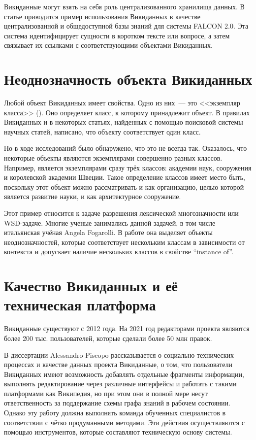 Викиданные могут взять на себя роль централизованного хранилища данных. В статье\autocite{Falcon_2.0} приводится пример использования Викиданных в качестве централизованной и общедоступной базы знаний для системы FALCON 2.0. Эта система идентифицирует сущности в коротком тексте или вопросе, а затем связывает их ссылками с соответствующими объектами Викиданных.

\section{Неоднозначность объекта Викиданных}

Любой объект Викиданных имеет свойства. Одно из них~--- это <<экземпляр класса>> (). Оно определяет класс, к которому принадлежит объект. В правилах Викиданных и в некоторых статьях\autocite{BabelNet}, найденных с помощью поисковой системы научных статей\footnotemark {}, написано, что объекту соответствует один класс.

Но в ходе исследований было обнаружено, что это не всегда так. Оказалось, что некоторые объекты являются экземплярами совершенно разных классов. Например,  является экземплярами сразу трёх классов: академии наук, сооружения и королевской академии Швеции. Такое определение классов имеет место быть, поскольку этот объект можно рассматривать и как организацию, целью которой является развитие науки, и как архитектурное сооружение. 

Этот пример относится к задаче разрешения лексической многозначности или WSD-задаче. Многие ученые занимались данной задачей, в том числе итальянская учёная Angela Fogarolli. В работе\autocite{Fogarolli} она выделяет объекты неоднозначностей, которые соответствует нескольким классам в зависимости от контекста и допускает наличие нескольких классов в свойстве ``instance of''.

\section{Качество Викиданных и её техническая платформа}

Викиданные существуют с 2012 года. На 2021 год редакторами проекта являются более 200 тыс. пользователей, которые сделали более 50 млн правок.

В диссертации Alessandro Piscopo\autocite{Piscopo} рассказывается о социально-технических процессах и качестве данных проекта Викиданные, о том, что пользователи Викиданных имеют возможность добавлять отдельные фрагменты информации, выполнять редактирование через различные интерфейсы и работать с такими платформами как Википедия, но при этом они в полной мере несут ответственность за поддержание схемы графа знаний в рабочем состоянии. Однако эту работу должна выполнять команда обученных специалистов в соответствии с чётко продуманными методами. Эти действия осуществляются с помощью инструментов, которые составляют техническую основу системы.

